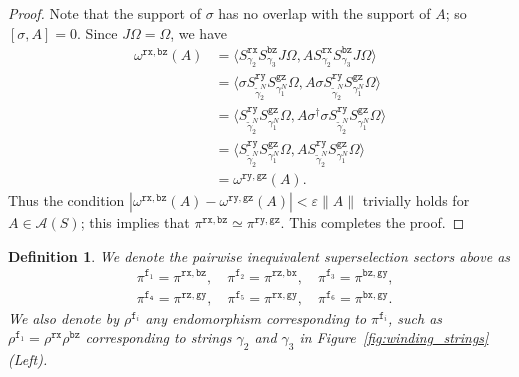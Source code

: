 \documentclass[a4paper,11pt]{article}
\newtheorem{definition}[theorem]{Definition}
\theoremstyle{definition}
\theoremstyle{remark}
\theoremstyle{remark}
\begin{document}
\begin{proof}
    Note that the support of $\sigma$ has no overlap with the support of $A$; so $[\sigma,A]=0$. 
    Since $J\Omega = \Omega$, we have 
    \begin{align*}
        \omega^{\mathtt{rx},\mathtt{bz}}(A) 
        & = \langle S_{\gamma_2}^{\mathtt{rx}}S_{\gamma_3}^{\mathtt{bz}} J\Omega, AS_{\gamma_2}^{\mathtt{rx}}S_{\gamma_3}^{\mathtt{bz}}J\Omega\rangle \\  
        & = \langle \sigma S^{\mathtt{ry}}_{\tilde{\gamma}_2^N}S^{\mathtt{gz}}_{\gamma_1^N} \Omega, A\sigma S^{\mathtt{ry}}_{\tilde{\gamma}_2^N}S^{\mathtt{gz}}_{\gamma_1^N} \Omega\rangle \\ 
        & = \langle S^{\mathtt{ry}}_{\tilde{\gamma}_2^N}S^{\mathtt{gz}}_{\gamma_1^N} \Omega, A\sigma ^\dagger\sigma S^{\mathtt{ry}}_{\tilde{\gamma}_2^N}S^{\mathtt{gz}}_{\gamma_1^N} \Omega\rangle \\ 
        & =  \langle S^{\mathtt{ry}}_{\tilde{\gamma}_2^N}S^{\mathtt{gz}}_{\gamma_1^N} \Omega, A S^{\mathtt{ry}}_{\tilde{\gamma}_2^N}S^{\mathtt{gz}}_{\gamma_1^N} \Omega\rangle \\
        & = \omega^{\mathtt{ry},\mathtt{gz}}(A). 
    \end{align*}
    Thus the condition $|\omega^{\mathtt{rx},\mathtt{bz}}(A) - \omega^{\mathtt{ry},\mathtt{gz}}(A)|<\varepsilon\|A\|$ trivially holds for $A\in \mathcal{A}(S)$; this implies that $\pi^{\mathtt{rx},\mathtt{bz}}\simeq \pi^{\mathtt{ry},\mathtt{gz}}$. This completes the proof.
\end{proof}

\begin{definition}
    We denote the pairwise inequivalent superselection sectors above as 
    \begin{align*}
        & \pi^{\mathtt{f}_1} = \pi^{\mathtt{rx},\mathtt{bz}}, \quad \pi^{\mathtt{f}_2} = \pi^{\mathtt{rz},\mathtt{bx}}, \quad \pi^{\mathtt{f}_3} = \pi^{\mathtt{bz},\mathtt{gy}}, \\
        & \pi^{\mathtt{f_4}} = \pi^{\mathtt{rz},\mathtt{gy}}, \quad \pi^{\mathtt{f}_5} = \pi^{\mathtt{rx},\mathtt{gy}}, \quad \pi^{\mathtt{f}_6} = \pi^{\mathtt{bx},\mathtt{gy}}. 
    \end{align*}
    We also denote by $\rho^{\mathtt{f}_i}$ any endomorphism corresponding to $\pi^{\mathtt{f}_i}$, such as $\rho^{\mathtt{f}_1} = \rho^{\mathtt{rx}}\rho^{\mathtt{bz}}$ corresponding to strings $\gamma_2$ and $\gamma_3$ in Figure~\ref{fig:winding_strings} (Left).  
\end{definition}
\end{document}
